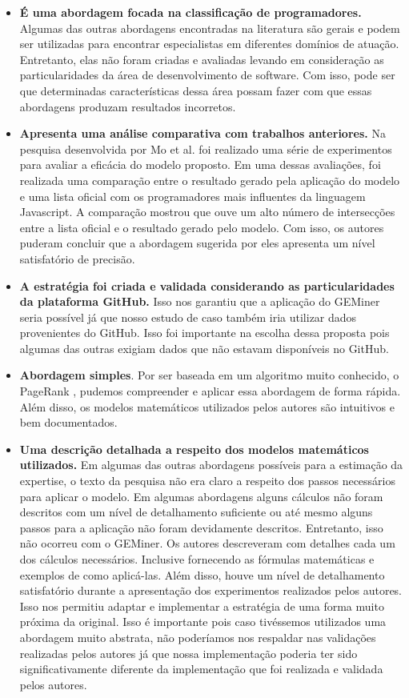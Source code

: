 \begin{itemize}
\item \textbf{É uma abordagem focada na classificação de programadores.} Algumas das outras abordagens encontradas na literatura são gerais e podem ser utilizadas para encontrar especialistas em diferentes domínios de atuação. Entretanto, elas não foram criadas e avaliadas levando em consideração as particularidades da área de desenvolvimento de software. Com isso, pode ser que determinadas características dessa área possam fazer com que essas abordagens produzam resultados incorretos.
\item \textbf{Apresenta uma análise comparativa com trabalhos anteriores.} Na pesquisa desenvolvida por  Mo et al.\cite{mo2015geminer} foi realizado uma série de experimentos para avaliar a eficácia do modelo proposto. Em uma dessas avaliações, foi realizada uma comparação entre o resultado gerado pela aplicação do modelo e uma lista oficial com os programadores mais influentes da linguagem Javascript. A comparação mostrou que ouve um alto número de intersecções entre a lista oficial e o resultado gerado pelo modelo. Com isso, os autores puderam concluir que a abordagem sugerida por eles apresenta um nível satisfatório de precisão. 
\item \textbf{A estratégia foi criada e validada considerando as particularidades da plataforma GitHub.} Isso nos garantiu que a aplicação do GEMiner seria possível já que nosso estudo de caso também iria utilizar dados provenientes do GitHub. Isso foi importante na escolha dessa proposta pois algumas das outras exigiam dados que não estavam disponíveis no GitHub.
\item \textbf{Abordagem simples}. Por ser baseada em um algoritmo muito conhecido, o  PageRank \cite{page1999pagerank},  pudemos compreender e aplicar essa abordagem de forma rápida. Além disso, os modelos matemáticos utilizados pelos autores são intuitivos e bem documentados.
\item \textbf{Uma descrição detalhada a respeito dos modelos matemáticos utilizados.} Em algumas das outras abordagens possíveis para a estimação da expertise, o texto da pesquisa não era claro a respeito dos passos necessários para aplicar o modelo. Em algumas abordagens alguns cálculos não foram descritos com um nível de detalhamento suficiente ou até mesmo alguns passos para a aplicação não foram devidamente descritos. Entretanto, isso não ocorreu com o GEMiner. Os autores descreveram com detalhes cada um dos cálculos necessários. Inclusive fornecendo as fórmulas matemáticas e exemplos de como aplicá-las. Além disso, houve um nível de detalhamento satisfatório durante a apresentação dos experimentos realizados pelos autores. Isso nos permitiu adaptar e implementar a estratégia de uma forma muito próxima da original. Isso é importante pois caso tivéssemos utilizados uma abordagem muito abstrata, não poderíamos nos respaldar nas validações realizadas pelos autores já que nossa implementação poderia ter sido significativamente diferente da implementação que foi realizada e validada pelos autores.

\end{itemize}
